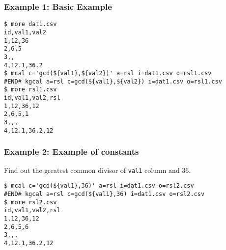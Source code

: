 \subsubsection*{Example 1: Basic Example}



\begin{Verbatim}[baselinestretch=0.7,frame=single]
$ more dat1.csv
id,val1,val2
1,12,36
2,6,5
3,,
4,12.1,36.2
$ mcal c='gcd(${val1},${val2})' a=rsl i=dat1.csv o=rsl1.csv
#END# kgcal a=rsl c=gcd(${val1},${val2}) i=dat1.csv o=rsl1.csv
$ more rsl1.csv
id,val1,val2,rsl
1,12,36,12
2,6,5,1
3,,,
4,12.1,36.2,12
\end{Verbatim}
\subsubsection*{Example 2: Example of constants}

Find out the greatest common divisor of \verb|val1| column and 36.


\begin{Verbatim}[baselinestretch=0.7,frame=single]
$ mcal c='gcd(${val1},36)' a=rsl i=dat1.csv o=rsl2.csv
#END# kgcal a=rsl c=gcd(${val1},36) i=dat1.csv o=rsl2.csv
$ more rsl2.csv
id,val1,val2,rsl
1,12,36,12
2,6,5,6
3,,,
4,12.1,36.2,12
\end{Verbatim}
